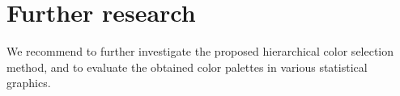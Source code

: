 \documentclass[review]{vgtc}                 %
\begin{document}
\section{Further research}

We recommend to further investigate the proposed hierarchical color selection method, and to evaluate the obtained color palettes in various statistical graphics.






\end{document}
